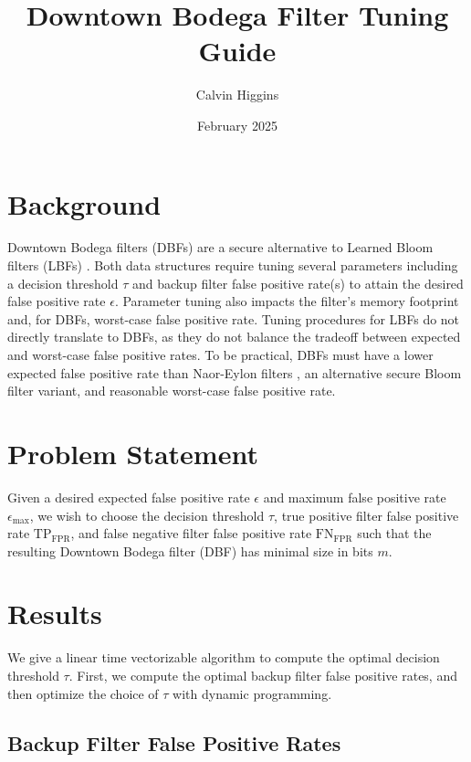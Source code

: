 \documentclass{article}
\title{Downtown Bodega Filter Tuning Guide}
\author{Calvin Higgins}
\date{February 2025}
\begin{document}
\maketitle

\section{Background}

Downtown Bodega filters (DBFs) \cite{bishop_tirmazi_2025} are a secure alternative to Learned Bloom filters (LBFs) \cite{kraska_beutel_chi_dean_polyzotis_2018}. Both data structures require tuning several parameters including a decision threshold $\tau$ and backup filter false positive rate(s) to attain the desired false positive rate $\epsilon$. Parameter tuning also impacts the filter's memory footprint and, for DBFs, worst-case false positive rate. Tuning procedures for LBFs do not directly translate to DBFs, as they do not balance the tradeoff between expected and worst-case false positive rates. To be practical, DBFs must have a lower expected false positive rate than Naor-Eylon filters \cite{naor_eylon_2019}, an alternative secure Bloom filter variant, and reasonable worst-case false positive rate.

\section{Problem Statement}

Given a desired expected false positive rate $\epsilon$ and maximum false positive rate $\epsilon_\text{max}$, we wish to choose the decision threshold $\tau$, true positive filter false positive rate $\text{TP}_\text{FPR}$, and false negative filter false positive rate $\text{FN}_\text{FPR}$ such that the resulting Downtown Bodega filter (DBF) has minimal size in bits $m$.

\section{Results}

We give a linear time vectorizable algorithm to compute the optimal decision threshold $\tau$. First, we compute the optimal backup filter false positive rates, and then optimize the choice of $\tau$ with dynamic programming. 

\subsection{Backup Filter False Positive Rates}
\label{section:backup_filter}
\end{document}

